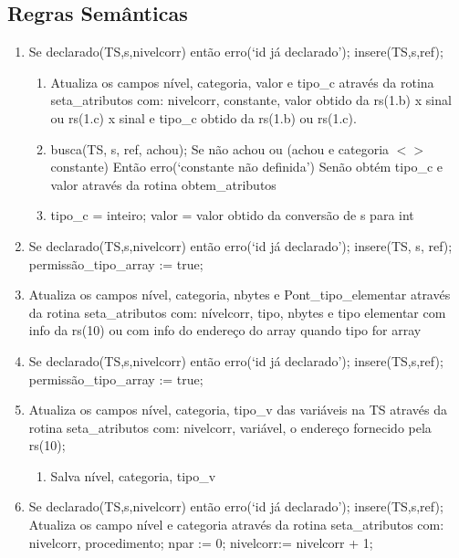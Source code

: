 \documentclass[a4paper,12pt]{article}
\begin{document}
    \subsection{Regras Semânticas}
    
    \begin{enumerate}
    \item Se declarado(TS,s,nivelcorr) então erro(‘id já declarado’);
insere(TS,s,ref);
    \begin{enumerate}
    	\item Atualiza os campos nível, categoria, valor e tipo\_c através da rotina seta\_atributos com: nivelcorr,
constante, valor obtido da rs(1.b) x sinal ou rs(1.c) x sinal e tipo\_c obtido da rs(1.b) ou rs(1.c).
		\item busca(TS, s, ref, achou);
Se não achou ou (achou e categoria $<>$ constante)
Então erro(‘constante não definida’)
Senão obtém tipo\_c e valor através da rotina obtem\_atributos
		
        \item tipo\_c = inteiro; valor = valor obtido da conversão de s para int 
	\end{enumerate}
	\item Se declarado(TS,s,nivelcorr) então erro(‘id já declarado’);
insere(TS, s, ref);
permissão\_tipo\_array := true;

	\item Atualiza os campos nível, categoria, nbytes e Pont\_tipo\_elementar através da rotina seta\_atributos com:
nívelcorr, tipo, nbytes e tipo elementar com info da rs(10) ou com info do endereço do array quando tipo for
array
	
    \item Se declarado(TS,s,nivelcorr) então erro(‘id já declarado’);
insere(TS,s,ref); permissão\_tipo\_array := true;
	
    \item Atualiza os campos nível, categoria, tipo\_v das variáveis na TS através da rotina seta\_atributos com:
nivelcorr, variável, o endereço fornecido pela rs(10);
    \begin{enumerate}
    \item Salva nível, categoria, tipo\_v
    \end{enumerate}
    
    \item  Se declarado(TS,s,nivelcorr) então erro(‘id já declarado’);
insere(TS,s,ref);
Atualiza os campo nível e categoria através da rotina seta\_atributos com: nivelcorr, procedimento;
npar := 0;
nivelcorr:= nivelcorr + 1;


\end{enumerate}
\end{document}
